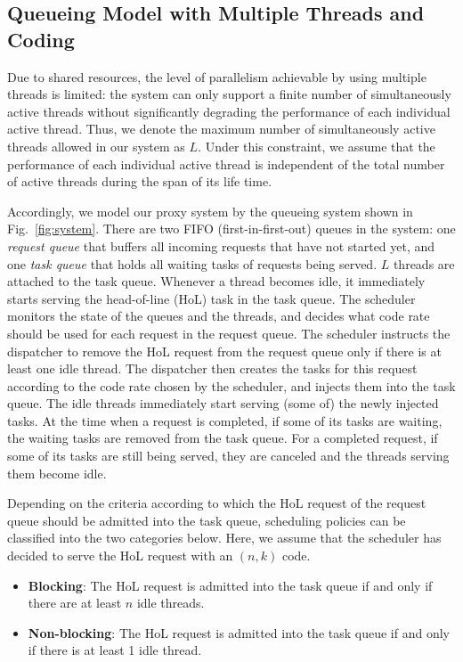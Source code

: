 \documentclass[journal]{IEEEtran}
\begin{document}
\subsection{Queueing Model with Multiple Threads and Coding}
Due to shared  resources, the level of parallelism achievable by using multiple threads is limited: the system can only support a finite number of simultaneously active threads without significantly degrading the performance of each individual active thread. Thus, we denote the maximum number of simultaneously active threads allowed in our system as $L$.
Under this constraint, we assume that the performance of each individual active thread is independent of the total number of active threads during the span of its life time.  

Accordingly, we model our proxy system by the queueing system shown in Fig.~\ref{fig:system}. There are two FIFO (first-in-first-out) queues in the system: one {\em request queue} that buffers all incoming requests that have not started yet, and one {\em task queue} that holds all waiting tasks of requests being served. $L$ threads are attached to the task queue. Whenever a thread becomes idle, it immediately starts serving the head-of-line (HoL) task in the task queue. The scheduler monitors the state of the queues and the threads, and decides what code rate should be used for each request in the request queue. The scheduler instructs the dispatcher to remove the HoL request from the request queue only if there is at least one idle thread. The dispatcher then creates the tasks for this request according to the code rate chosen by the scheduler, and injects them into the task queue. The idle threads immediately start serving (some of) the newly injected tasks. At the time when a request is completed, if some of its tasks are waiting, the waiting tasks are removed from the task queue. For a completed request,  if some of its tasks are still being served, they are canceled and the threads serving them become idle.



Depending on the criteria according to which the HoL request of the request queue should be admitted into the task queue, scheduling policies can be classified into the two categories below. Here, we assume that the scheduler has decided to serve the HoL request with an $(n,k)$ code.
\begin{itemize}
\item {\bf Blocking}: The HoL request is admitted into the task queue if and only if there are at least $n$ idle threads. 

\item {\bf Non-blocking}: The HoL request is admitted into the task queue if and only if there is at least 1 idle thread.
\end{itemize} 
 
\end{document}
